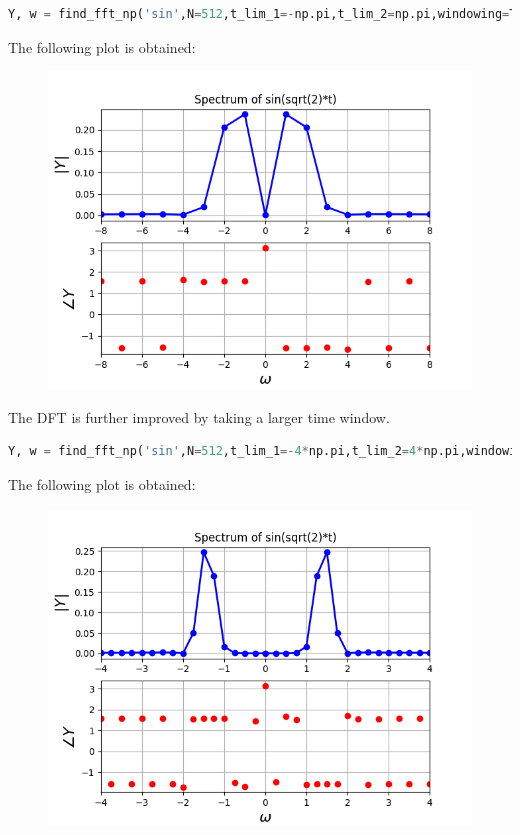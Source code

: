 \documentclass[11pt, a4paper]{article}
\begin{document}
\begin{lstlisting}[language = Python]
Y, w = find_fft_np('sin',N=512,t_lim_1=-np.pi,t_lim_2=np.pi,windowing=True,x_limit=8,plot=True)
\end{lstlisting}
The following plot is obtained:
\begin{figure}[H]
     \centering
     \includegraphics[scale=0.8]{Figure_2.png}
\end{figure}

The DFT is further improved by taking a larger time window.
\begin{lstlisting}[language = Python]
Y, w = find_fft_np('sin',N=512,t_lim_1=-4*np.pi,t_lim_2=4*np.pi,windowing=True,x_limit=4,plot=True)
\end{lstlisting}
The following plot is obtained:
\begin{figure}[H]
     \centering
     \includegraphics[scale=0.8]{Figure_3.png}
\end{figure}
\end{document}
